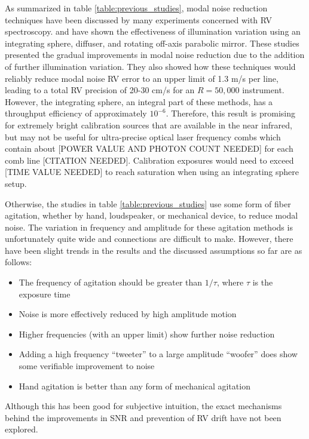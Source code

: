 \documentclass[twocolumn]{emulateapj}
\begin{document}
As summarized in table \ref{table:previous_studies}, modal noise reduction techniques have been discussed by many experiments concerned with RV spectroscopy. \cite{Mahadevan2014} and \cite{Halverson2014} have shown the effectiveness of illumination variation using an integrating sphere, diffuser, and rotating off-axis parabolic mirror. These studies presented the gradual improvements in modal noise reduction due to the addition of further illumination variation. They also showed how these techniques would reliably reduce modal noise RV error to an upper limit of 1.3 m/s per line, leading to a total RV precision of 20-30 cm/s for an $R = 50,000$ instrument. However, the integrating sphere, an integral part of these methods, has a throughput efficiency of approximately $10^{-6}$. Therefore, this result is promising for extremely bright calibration sources that are available in the near infrared, but may not be useful for ultra-precise optical laser frequency combs which contain about [POWER VALUE AND PHOTON COUNT NEEDED] for each comb line [CITATION NEEDED]. Calibration exposures would need to exceed [TIME VALUE NEEDED] to reach saturation when using an integrating sphere setup.

Otherwise, the studies in table \ref{table:previous_studies} use some form of fiber agitation, whether by hand, loudspeaker, or mechanical device, to reduce modal noise. The variation in frequency and amplitude for these agitation methods is unfortunately quite wide and connections are difficult to make. However, there have been slight trends in the results and the discussed assumptions so far are as follows:
\begin{itemize}
\item The frequency of agitation should be greater than $1/\tau$, where $\tau$ is the exposure time \citep{Baudrand2001}
\item Noise is more effectively reduced by high amplitude motion \citep{Lemke2011, McCoy2012}
\item Higher frequencies (with an upper limit) show further noise reduction \citep{Lemke2011}
\item Adding a high frequency ``tweeter'' to a large amplitude ``woofer'' does show some verifiable improvement to noise \citep{Plavchan2013}
\item Hand agitation is better than any form of mechanical agitation \citep{Lemke2011, McCoy2012, Mahadevan2014, Roy2014}
\end{itemize}
Although this has been good for subjective intuition, the exact mechanisms behind the improvements in SNR and prevention of RV drift have not been explored.
\end{document}
